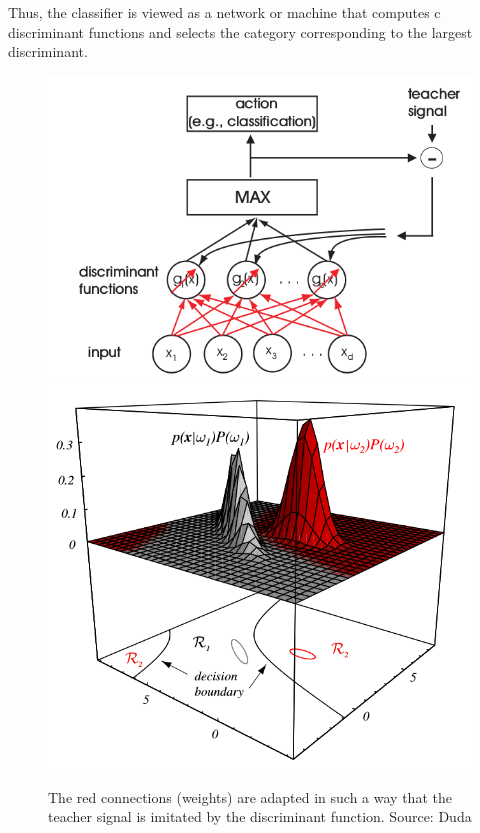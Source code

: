\documentclass[main]{subfiles}
\begin{document}
Thus, the classifier is viewed as a network or machine that computes c discriminant
functions and selects the category corresponding to the largest discriminant.
\begin{figure}[H]
\centering
\includegraphics[width=0.47\linewidth]{figs/Adaptive-Discriminant-functions.png}
\includegraphics[width=0.47\linewidth]{figs/DF-decision-boundaries.png}
\caption{The red connections (weights) are adapted in such a way that the
teacher signal is imitated by the discriminant function. Source: Duda}
\end{figure}
\end{document}
